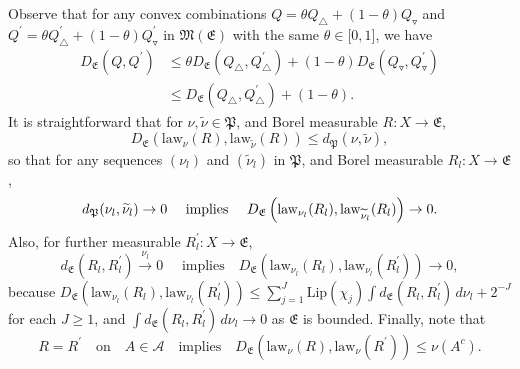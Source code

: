 \documentclass[10pt]{amsart}
\theoremstyle{definition}\newtheorem{defi}[theo]{Definition}\newtheorem{rema}[theo]{Remark}\newtheorem{exam}[theo]{Example}\newtheorem{exem}[theo]{Example}\newtheorem{nota}[theo]{Notation}
\newcommand{\clA}{\mathcal{A}}
\newcommand{\law}{\mathrm{law}}
\newcommand{\Lip}{\mathrm{Lip}}
\newcommand{\frkP}{\mathfrak{P}}
\newcommand{\frkE}{\mathfrak{E}}
\newcommand{\frkM}{\mathfrak{M}}
\begin{document}
Observe that for any convex combinations $Q=\theta Q_{\triangle} +(1-\theta)Q_{\triangledown}$ and $Q^{\prime}=\theta Q_{\triangle}^{\prime }+(1-\theta)Q_{\triangledown}^{\prime}$ in $\frkM(\frkE)$ with the same $\theta\in\lbrack0,1]$, we have
\begin{equation}\label{Eq_Tree2}
\begin{split}
D_{\frkE}\left(Q,Q^{\prime}\right) &\leq\theta D_{\frkE}\left(Q_{\triangle },Q_{\triangle}^{\prime}\right)+\left(1-\theta\right)D_{\frkE}\left(Q_{\triangledown},Q_{\triangledown}^{\prime}\right)\\
 &\leq D_{\frkE}\left(Q_{\triangle},Q_{\triangle}^{\prime}\right)+(1-\theta).
\end{split}
\end{equation}
It is straightforward that for $\nu,\widetilde{\nu}\in\frkP$, and Borel measurable $R:X\rightarrow\frkE$,
\begin{equation}\label{Eq_ererrewrerwrertrerwerq}
D_{\frkE}\left(\law_{\nu}(R),\law_{\widetilde{\nu}}(R)\right)\leq d_{\frkP}\left(\nu,\widetilde{\nu}\right),
\end{equation}
so that for any sequences $(\nu_{l})$ and $(\widetilde{\nu}_{l})$ in $\frkP$, and Borel measurable $R_{l}:X\rightarrow\frkE$,
\begin{equation}\label{Eq_vcbycxvcygvchatecv356463456}
d_{\frkP}(\nu_{l},\widetilde{\nu}_{l})\rightarrow0\quad \text{ implies
\quad}D_{\frkE}\left(\law_{\nu_{l}}(R_{l}),\law _{\widetilde{\nu}_{l}}(R_{l})\right)\rightarrow0.
\end{equation}
Also, for further measurable $R_{l}^{\prime}:X\rightarrow\frkE$,
\begin{equation}\label{Eq_Tree1}
d_{\frkE}\left(R_{l},R_{l}^{\prime}\right)\overset{\nu_{l}}{\longrightarrow }0\quad \text{ implies} \quad D_{\frkE}\left(\law_{\nu_{l}} \left(R_{l}\right),\law_{\nu_{l}}\left(R_{l}^{\prime}\right)\right)\rightarrow0,
\end{equation}
because $D_{\frkE}(\law_{\nu_{l}}(R_{l}),\law_{\nu_{l} }(R_{l}^{\prime}))\leq {\sum\nolimits_{j=1}^{J}}
\Lip(\chi_{j})\int d_{\frkE}(R_{l},R_{l}^{\prime})\,d\nu _{l}+2^{-J}$ for each $J\geq1$, and $\int d_{\frkE}(R_{l},R_{l} ^{\prime})\,d\nu_{l}\rightarrow0$ as $\frkE$ is bounded. Finally, note that
\begin{equation}
R=R^{\prime}\quad \text{on}\quad A\in\clA \quad\text{implies} \quad  D_{\frkE}\left(\law_{\nu}(R),\law_{\nu}\left(R^{\prime}\right)\right)\leq\nu\left(A^{c}\right).
\end{equation}
\end{document}

